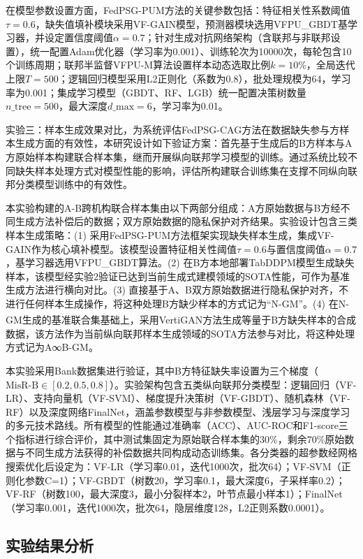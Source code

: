 在模型参数设置方面，FedPSG-PUM方法的关键参数包括：特征相关性系数阈值$\tau=0.6$，缺失值填补模块采用VF-GAIN模型，预测器模块选用VFPU\_GBDT基学习器，并设定置信度阈值$\alpha=0.7$；针对生成对抗网络架构（含联邦与非联邦设置），统一配置Adam优化器（学习率为0.001）、训练轮次为10000次，每轮包含10个训练周期；联邦半监督VFPU-M算法设置样本动态选取比例$k=10\%$，全局迭代上限$T=500$；逻辑回归模型采用L2正则化（系数为0.8），批处理规模为64，学习率为0.001；集成学习模型（GBDT、RF、LGB）统一配置决策树数量$n\_{\text{tree}}=500$，最大深度$d\_{\text{max}}=6$，学习率为0.01。

实验三：样本生成效果对比，为系统评估FedPSG-CAG方法在数据缺失参与方样本生成方面的有效性，本研究设计如下验证方案：首先基于生成后的B方样本与A方原始样本构建联合样本集，继而开展纵向联邦学习模型的训练。通过系统比较不同缺失样本处理方式对模型性能的影响，评估所构建联合训练集在支撑不同纵向联邦分类模型训练中的有效性。

本实验构建的A-B跨机构联合样本集由以下两部分组成：A方原始数据与B方经不同生成方法补偿后的数据；双方原始数据的隐私保护对齐结果。实验设计包含三类样本生成策略：(1) 采用FedPSG-PUM方法框架实现缺失样本生成，集成VF-GAIN作为核心填补模型。该模型设置特征相关性阈值$\tau=0.6$与置信度阈值$\alpha=0.7$，基学习器选用VFPU\_GBDT算法。(2) 在B方本地部署TabDDPM模型生成缺失样本，该模型经实验2验证已达到当前生成式建模领域的SOTA性能，可作为基准生成方法进行横向对比。(3) 直接基于A、B双方原始数据进行隐私保护对齐，不进行任何样本生成操作，将这种处理B方缺少样本的方式记为“N-GM”。(4) 在N-GM生成的基准联合集基础上，采用VertiGAN\textsuperscript{\cite{VertiGAN}}方法生成等量于B方缺失样本的合成数据，该方法作为当前纵向联邦样本生成领域的SOTA方法参与对比，将这种处理方式记为A∞B-GM。

本实验采用Bank数据集进行验证，其中B方特征缺失率设置为三个梯度（$\text{MisR-B} \in [0.2,0.5,0.8]$）。实验架构包含五类纵向联邦分类模型：逻辑回归（VF-LR）、支持向量机（VF-SVM）、梯度提升决策树（VF-GBDT）、随机森林（VF-RF）以及深度网络FinalNet，涵盖参数模型与非参数模型、浅层学习与深度学习的多元技术路线。所有模型的性能通过准确率（ACC）、AUC-ROC和F1-score三个指标进行综合评价，其中测试集固定为原始联合样本集的30\%，剩余70\%原始数据与不同生成方法获得的补偿数据共同构成动态训练集。各分类器的超参数经网格搜索优化后设定为：VF-LR（学习率0.01，迭代1000次，批次64）；VF-SVM（正则化参数C=1）；VF-GBDT（树数20，学习率0.1，最大深度6，子采样率0.2）；VF-RF（树数100，最大深度3，最小分裂样本2，叶节点最小样本1）；FinalNet（学习率0.001，迭代1000次，批次64，隐层维度128，L2正则系数0.0001）。


\subsection{实验结果分析}

